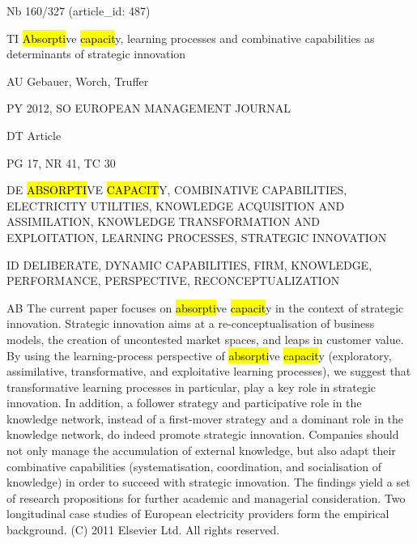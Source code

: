 \documentclass[a4paper]{article}
\begin{document}
\vspace*{-2cm}
Nb \tabto{0cm}160/327 (article\_id: 487)\par
TI \tabto{0cm}\hl{Absorpti}ve \hl{capacit}y, learning processes and combinative capabilities as determinants of strategic innovation\par
AU \tabto{0cm}Gebauer, Worch, Truffer\par
PY \tabto{0cm}2012, SO EUROPEAN MANAGEMENT JOURNAL\par
DT \tabto{0cm}Article\par
PG \tabto{0cm}17, NR 41, TC 30\par
DE \tabto{0cm}\hl{ABSORPTI}VE \hl{CAPACIT}Y, COMBINATIVE CAPABILITIES, ELECTRICITY UTILITIES, KNOWLEDGE ACQUISITION AND ASSIMILATION, KNOWLEDGE TRANSFORMATION AND EXPLOITATION, LEARNING PROCESSES, STRATEGIC INNOVATION\par
ID \tabto{0cm}DELIBERATE, DYNAMIC CAPABILITIES, FIRM, KNOWLEDGE, PERFORMANCE, PERSPECTIVE, RECONCEPTUALIZATION\par
AB \tabto{0cm}The current paper focuses on \hl{absorpti}ve \hl{capacit}y in the context of strategic innovation. Strategic innovation aims at a re-conceptualisation of business models, the creation of uncontested market spaces, and leaps in customer value. By using the learning-process perspective of \hl{absorpti}ve \hl{capacit}y (exploratory, assimilative, transformative, and exploitative learning processes), we suggest that transformative learning processes in particular, play a key role in strategic innovation. In addition, a follower strategy and participative role in the knowledge network, instead of a first-mover strategy and a dominant role in the knowledge network, do indeed promote strategic innovation. Companies should not only manage the accumulation of external knowledge, but also adapt their combinative capabilities (systematisation, coordination, and socialisation of knowledge) in order to succeed with strategic innovation. The findings yield a set of research propositions for further academic and managerial consideration. Two longitudinal case studies of European electricity providers form the empirical background. (C) 2011 Elsevier Ltd. All rights reserved.\par
\clearpage
\end{document}
